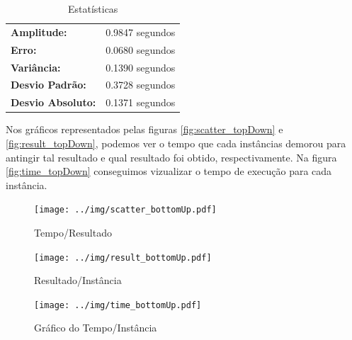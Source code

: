 \documentclass[a4paper, 12pt]{article}
\begin{document}
\vspace{-15pt}

\begin{table}[!htb]
    \begin{tabular}{ll}
    \textbf{Amplitude:} & 0.9847 segundos \\
    \textbf{Erro:} & 0.0680 segundos \\
    \textbf{Variância:} & 0.1390 segundos \\
    \textbf{Desvio Padrão:} & 0.3728 segundos \\
    \textbf{Desvio Absoluto:} & 0.1371 segundos
    \end{tabular}
    \caption{Estatísticas}
    \label{tab:estatistica_bottomup}
\end{table}

\newpage
Nos gráficos representados pelas figuras \ref{fig:scatter_topDown} e \ref{fig:result_topDown}, podemos ver o tempo
que cada instâncias demorou para antingir tal resultado e qual resultado foi obtido, respectivamente. 
Na figura \ref{fig:time_topDown} conseguimos vizualizar o tempo de execução para cada instância.
\begin{figure}[!htb]
    \centering
    \begin{minipage}{0.55\textwidth}
        \centering
        \texttt{[image: ../img/scatter\_bottomUp.pdf]}
        \caption{Tempo/Resultado}
        \label{fig:scatter_bottomUp}
    \end{minipage}%
    \begin{minipage}{0.55\textwidth}
        \centering
        \texttt{[image: ../img/result\_bottomUp.pdf]}
        \caption{Resultado/Instância}
        \label{fig:result_bottomUp}
    \end{minipage}
\end{figure}

\begin{figure}[!htb]
    \centering
    \texttt{[image: ../img/time\_bottomUp.pdf]}
    \caption{Gráfico do Tempo/Instância}
    \label{fig:time_bottomUp}
\end{figure}

\clearpage
\end{document}
